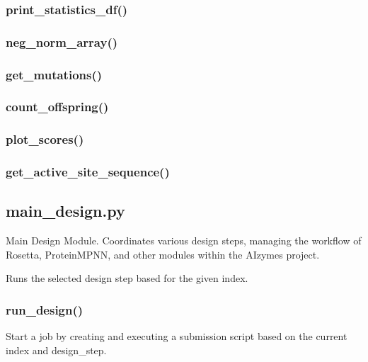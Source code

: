 \documentclass[10pt]{extarticle}
\begin{document}
\subsubsection{print\_statistics\_df()}
\subsubsection{neg\_norm\_array()}
\subsubsection{get\_mutations()}
\subsubsection{count\_offspring()}
\subsubsection{plot\_scores()}
\subsubsection{get\_active\_site\_sequence()}
\subsection{main\_design.py}
Main Design Module. Coordinates various design steps, managing the workflow of Rosetta, ProteinMPNN, and other modules
within the AIzymes project.

\par\vspace*{0.5\baselineskip}
{
\begin{description}[noitemsep,topsep=0pt,parsep=0pt,labelwidth=5cm,leftmargin=!,labelindent=0pt,labelsep=0.2cm,itemsep=0pt]
\item[\textcolor{mpgAccentBlue!75!white}{run\_design\dotfill}] Runs the selected design step based for the given index.
\end{description}
}
\par\vspace*{0.5\baselineskip}
\subsubsection{run\_design()}
Start a job by creating and executing a submission script based on the current index and design\_step.
\end{document}
